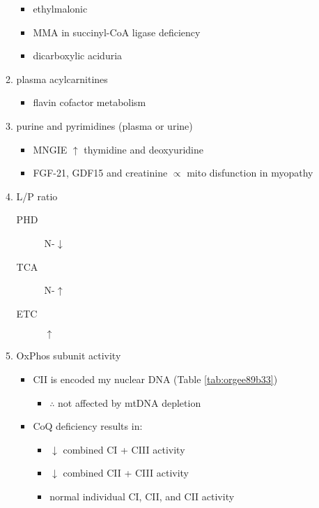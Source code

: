 \documentclass{scrartcl}
\begin{document}
\begin{enumerate}
\begin{enumerate}
\begin{itemize}
\item ethylmalonic
\item MMA in succinyl-CoA ligase deficiency
\item dicarboxylic aciduria
\end{itemize}
\item plasma acylcarnitines
\label{sec:orga909c68}
\begin{itemize}
\item flavin cofactor metabolism
\end{itemize}
\item purine and pyrimidines (plasma or urine)
\label{sec:org50a15c3}
\begin{itemize}
\item MNGIE \(\uparrow\) thymidine and deoxyuridine
\end{itemize}
\begin{itemize}
\item FGF-21, GDF15 and creatinine \(\propto\) mito disfunction in myopathy
\end{itemize}

\item L/P ratio
\label{sec:org99c5836}
\begin{description}
\item[{PHD}] N-\(\downarrow\)
\item[{TCA}] N-\(\uparrow\)
\item[{ETC}] \(\uparrow\)
\end{description}
\item OxPhos subunit activity
\label{sec:org27a79fc}
\begin{itemize}
\item CII is encoded my nuclear DNA (Table \ref{tab:orgee89b33})
\begin{itemize}
\item \(\therefore\) not affected by mtDNA depletion
\end{itemize}
\item CoQ deficiency results in:
\begin{itemize}
\item \(\downarrow\) combined CI + CIII activity
\item \(\downarrow\) combined CII + CIII activity
\item normal individual CI, CII, and CII activity
\end{itemize}
\end{itemize}
\end{enumerate}


\end{enumerate}
\end{document}
